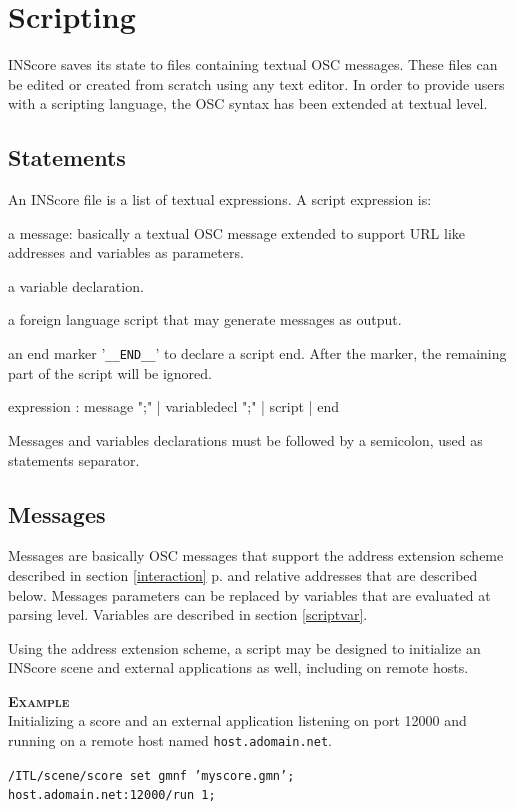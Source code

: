 \documentclass[a4paper,twoside]{report}
\newcommand{\toplevel}[1]	{\chapter{#1}}
\newcommand{\sublevel}[1]	{\section{#1}}
\newcommand{\fullref}[1]	{\ref{#1} p.\pageref{#1}}
\newcommand{\OSC}[1]		{\texttt{#1}}
\newcommand{\example}		{\textbf{\hspace{-1.5cm}\textbf{\textsc{Example }}}}
\let\olditemize\itemize
\let\oldenditemize\enditemize
\renewenvironment{itemize} 	{\olditemize \setlength{\itemsep}{1mm}}{\oldenditemize}
\newcommand{\sample}	[1]			{\vspace{-2mm}\begin{center}\colorbox{mygrey}{
								\begin{minipage}[t]{0.9\columnwidth} 
								{\small \texttt{#1}}
								\end{minipage}}\end{center}}
\begin{document}
\toplevel{Scripting}
\label{scripting}

INScore saves its state to files containing textual OSC messages. These files can be edited or created from scratch using any text editor. In order to provide users with a scripting language, the OSC syntax has been extended at textual level.

\sublevel{Statements}\label{scriptstatement}
An INScore file is a list of textual expressions. A script expression is:
\begin{itemize}
\item a message: basically a textual OSC message extended to support URL like addresses and variables as parameters.
\item a variable declaration.
\item a foreign language script that may generate messages as output.
\item an end marker '\OSC{\_\_END\_\_}' to declare a script end. After the marker, the remaining part of the script will be ignored.
\end{itemize}

\begin{rail}
expression :  
		 	message ";"
		| 	variabledecl ";"
		| 	script
		|   end
\end{rail}

Messages and variables declarations must be followed by a semicolon, used as statements separator.

\sublevel{Messages}\label{scriptmsgs}

Messages are basically OSC messages that support the address extension scheme described in section \fullref{interaction} and relative addresses that are described below.
Messages parameters can be replaced by variables that are evaluated at parsing level. Variables are described in section \ref{scriptvar}.

Using the address extension scheme, a script may be designed to initialize an INScore scene and external applications as well, including on remote hosts.

\example\\
Initializing a score and an external application listening on port 12000 and running on a remote host named \OSC{host.adomain.net}.
\sample{/ITL/scene/score set gmnf 'myscore.gmn';\\
host.adomain.net:12000/run 1;
}
\end{document}
